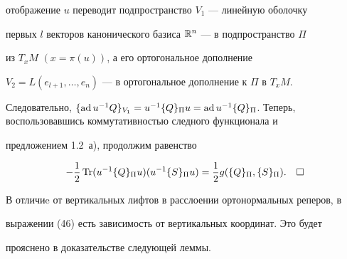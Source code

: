 отображение $u$ переводит подпространство $V_1$ --- линейную оболочку


первых $l$ векторов канонического базиса $\Bbb R^n$ --- в подпространство $\Pi$


из $T_xM$ $(x=\pi (u))$, а его ортогональное дополнение


$V_2=L(e_{l+1},\dotsc,e_n)$ --- в ортогональное дополнение к $\Pi $ в $T_xM$.


Следовательно, $\{ \ad u^{-1}Q\} _{V_1}=u^{-1}\{ Q\} _\Pi u=\ad u^{-1}\{


Q\} _\Pi$. Теперь, воспользовавшись коммутативностью следного функционала и


предложением 1.2~а), продолжим равенство


$$


-\1 \Tr(u^{-1}\{ Q\}_\Pi u)(u^{-1}\{ S\}_\Pi u)=\1 g(\{ Q\}_\Pi,\{ S\}_\Pi).


\quad \square


$$





В отличиe от вертикальных лифтов в расслоении ортонормальных реперов, в


выражении (46) есть зависимость от вертикальных координат. Это будет


прояснено в доказательстве следующей леммы.





